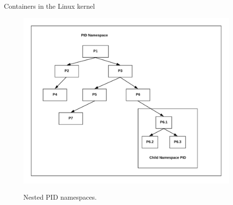 \begin{frame}{Containers in the Linux kernel}
	\begin{figure}
		\centering
		\includegraphics[scale=.137]{pidNamespace.png}
		\label{fig:pidnamespace}
		\caption{Nested PID namespaces.}
	\end{figure}
\end{frame}
